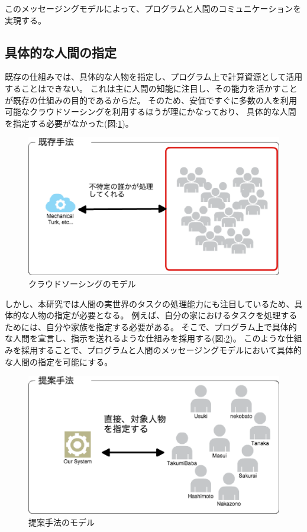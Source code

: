 このメッセージングモデルによって、プログラムと人間のコミュニケーションを実現する。

\subsection{具体的な人間の指定}\label{ux5177ux4f53ux7684ux306aux4ebaux9593ux306eux6307ux5b9a}

既存の仕組みでは、具体的な人物を指定し、プログラム上で計算資源として活用することはできない。
これは主に人間の知能に注目し、その能力を活かすことが既存の仕組みの目的であるからだ。
そのため、安価ですぐに多数の人を利用可能なクラウドソーシングを利用するほうが理にかなっており、
具体的な人間を指定する必要がなかった(図:\ref{fig:crowdsourcing_model})。

\begin{figure}[htbp]
  \begin{center}
  \includegraphics[width=.5\linewidth]{images/crowdsourcing_model.eps}
  \end{center}
  \caption{クラウドソーシングのモデル}
  \label{fig:crowdsourcing_model}
\end{figure}

しかし、本研究では人間の実世界のタスクの処理能力にも注目しているため、具体的な人物の指定が必要となる。
例えば、自分の家におけるタスクを処理するためには、自分や家族を指定する必要がある。
そこで、プログラム上で具体的な人間を宣言し、指示を送れるような仕組みを採用する(図:\ref{fig:unique_id_model})。
このような仕組みを採用することで、プログラムと人間のメッセージングモデルにおいて具体的な人間の指定を可能にする。

\begin{figure}[htbp]
  \begin{center}
  \includegraphics[width=.5\linewidth]{images/unique_id_model.eps}
  \end{center}
  \caption{提案手法のモデル}
  \label{fig:unique_id_model}
\end{figure}

